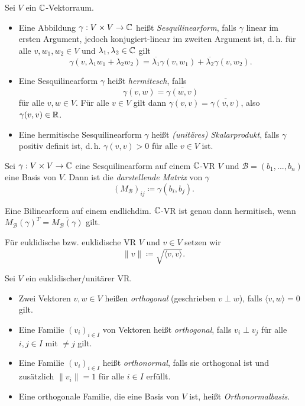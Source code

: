 \documentclass{cheat-sheet}
\newcommand{\BB}{\mathcal{B}}
\begin{document}
\begin{definition}
Sei $V$ ein $\mathbb{C}$-Vektorraum.
\begin{itemize}
  \item Eine Abbildung $\gamma : V \times V \to \mathbb{C}$ heißt \emph{Sesquilinearform}, falls $\gamma$ linear im ersten Argument, jedoch konjugiert-linear im zweiten Argument ist, d.\,h. für alle $v, w_1, w_2 \in V$ und $\lambda_1, \lambda_2 \in \mathbb{C}$ gilt
  \[ \gamma(v, \lambda_1 w_1 + \lambda_2 w_2) = \overline{\lambda_1} \gamma(v, w_1) + \overline{\lambda_2} \gamma(v, w_2). \]
  \item Eine Sesquilinearform $\gamma$ heißt \emph{hermitesch}, falls
  \[ \gamma(v, w) = \overline{\gamma(w, v)} \]
  für alle $v, w \in V$. Für alle $v \in V$ gilt dann $\gamma(v, v) = \overline{\gamma(v, v)}$, also $\gamma(v, v) \in \mathbb{R}$.
  \item Eine hermitische Sesquilinearform $\gamma$ heißt \emph{(unitäres) Skalarprodukt}, falls $\gamma$ positiv definit ist, d.\,h. $\gamma(v, v) > 0$ für alle $v \in V$ ist.
\end{itemize}
\end{definition}

\begin{definition}
Sei $\gamma : V \times V \to \mathbb{C}$ eine Sesquilinearform auf einem $\mathbb{C}$-VR $V$ und $\BB = (b_1, ..., b_n)$ eine Basis von $V$. Dann ist die \emph{darstellende Matrix} von $\gamma$
\[ (M_{\BB})_{ij} \coloneqq \gamma(b_i, b_j). \]
\end{definition}

\begin{bem}
Eine Bilinearform auf einem endlichdim. $\mathbb{C}$-VR ist genau dann hermitisch, wenn $M_{\BB}(\gamma)^{T} = \overline{M_{\BB}(\gamma)}$ gilt. 
\end{bem}

\begin{definition}
Für euklidische bzw. euklidische VR $V$ und $v \in V$ setzen wir
\[ \| v \| \coloneqq \sqrt{ \langle v , v \rangle }. \]
\end{definition}

\begin{definition}
Sei $V$ ein euklidischer/unitärer VR.
\begin{itemize}
  \item Zwei Vektoren $v, w \in V$ heißen \emph{orthogonal} (geschrieben $v \perp w$), falls $\langle v , w \rangle = 0$ gilt.
  \item Eine Familie $(v_i)_{i \in I}$ von Vektoren heißt \emph{orthogonal}, falls $v_i \perp v_j$ für alle $i, j \in I$ mit $ \not= j$ gilt.
  \item Eine Familie $(v_i)_{i \in I}$ heißt \emph{orthonormal}, falls sie orthogonal ist und zusätzlich $\| v_i \| = 1$ für alle $i \in I$ erfüllt.
  \item Eine orthogonale Familie, die eine Basis von $V$ ist, heißt \emph{Orthonormalbasis}.
\end{itemize}
\end{definition}
\end{document}
